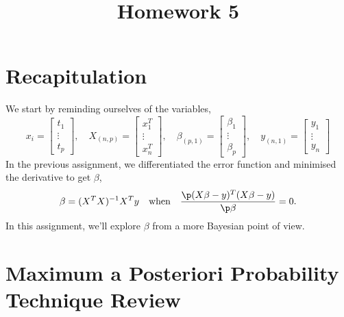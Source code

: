 \documentclass{homework}
\title{Homework 5}
\begin{document}
 \maketitle

\section{Recapitulation}

We start by reminding ourselves of the variables,
\[
  x_i =
  \begin{bmatrix}%
    t_1 \\ \vdots \\ t_{p}
  \end{bmatrix},
  \quad
  X_{(n, p)} =
  \begin{bmatrix}
    x^T_1 \\ \vdots \\ x^T_n
  \end{bmatrix},
  \quad
  \beta_{(p, 1)} =
  \begin{bmatrix}
    \beta_1 \\ \vdots \\ \beta_p
  \end{bmatrix},
  \quad
  y_{(n, 1)} =
  \begin{bmatrix}
    y_1 \\ \vdots \\ y_n
  \end{bmatrix}
\]
In the previous assignment, we differentiated the error function and
minimised the derivative to get $\beta$,
\[
  \beta = (X^TX)^{-1}X^Ty
  \quad\text{when}\quad
  \frac{\p (X\beta - y)^T(X\beta - y)}{\p \beta} = 0.
\]
In this assignment, we'll explore $\beta$ from a more Bayesian point of view.

\section{Maximum a Posteriori Probability Technique Review}
\end{document}
